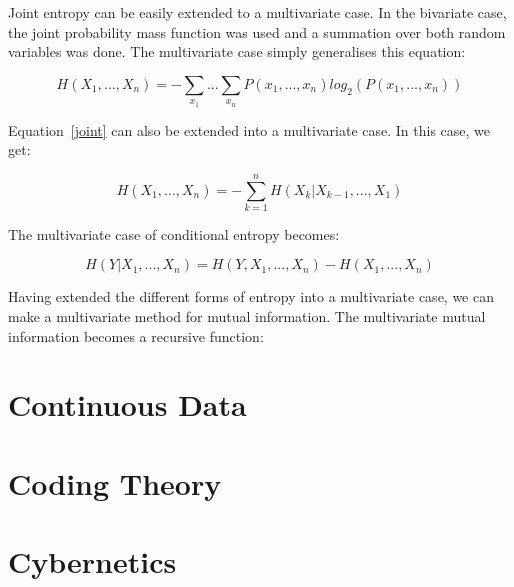 Joint entropy can be easily extended to a multivariate case. In the bivariate case, the joint probability mass function was used and a summation over both random variables was done. The multivariate case simply generalises this equation:

\begin{equation}
H(X_1, ..., X_n) = -\sum_{x_1}...\sum_{x_n}P(x_1,...,x_n)log_2(P(x_1,...,x_n))
\end{equation}

Equation~\ref{joint} can also be extended into a multivariate case. In this case, we get:

\begin{equation}
H(X_1, ..., X_n) = -\sum_{k=1}^{n}H(X_k|X_{k-1},...,X_1)
\end{equation}

The multivariate case of conditional entropy becomes:

\begin{equation}
H(Y | X_1, ..., X_n) = H(Y, X_1, ..., X_n) - H(X_1, ..., X_n)
\end{equation}

Having extended the different forms of entropy into a multivariate case, we can make a multivariate method for mutual information. The multivariate mutual information becomes a recursive function:


\section{Continuous Data}


\section{Coding Theory}

\section{Cybernetics}